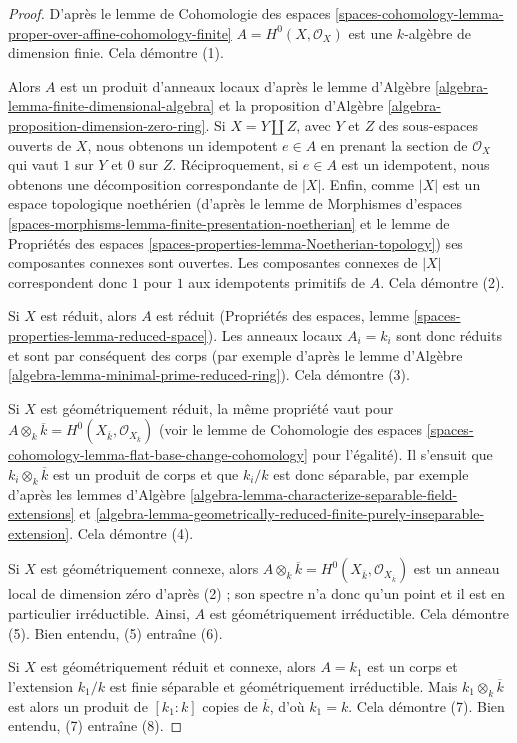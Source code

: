 \begin{proof}
D'après le lemme de Cohomologie des espaces
\ref{spaces-cohomology-lemma-proper-over-affine-cohomology-finite}
$A = H^0(X, \mathcal{O}_X)$ est une
$k$-algèbre de dimension finie. Cela démontre (1).

\medskip\noindent
Alors $A$ est un produit d'anneaux locaux d'après le
lemme d'Algèbre \ref{algebra-lemma-finite-dimensional-algebra} et la
proposition d'Algèbre \ref{algebra-proposition-dimension-zero-ring}.
Si $X = Y \amalg Z$, avec $Y$ et $Z$ des sous-espaces ouverts de $X$, nous obtenons
un idempotent $e \in A$ en prenant la section de $\mathcal{O}_X$
qui vaut $1$ sur $Y$ et $0$ sur $Z$. Réciproquement, si $e \in A$
est un idempotent, nous obtenons une décomposition correspondante de $|X|$.
Enfin, comme $|X|$ est un espace topologique noethérien
(d'après le lemme de Morphismes d'espaces
\ref{spaces-morphisms-lemma-finite-presentation-noetherian} et
le lemme de Propriétés des espaces
\ref{spaces-properties-lemma-Noetherian-topology})
ses composantes connexes sont ouvertes. Les composantes connexes
de $|X|$ correspondent donc $1$ pour $1$ aux idempotents primitifs de $A$.
Cela démontre (2).

\medskip\noindent
Si $X$ est réduit, alors $A$ est réduit
(Propriétés des espaces, lemme \ref{spaces-properties-lemma-reduced-space}).
Les anneaux locaux $A_i = k_i$ sont donc réduits et sont par conséquent des corps
(par exemple d'après le lemme d'Algèbre \ref{algebra-lemma-minimal-prime-reduced-ring}).
Cela démontre (3).

\medskip\noindent
Si $X$ est géométriquement réduit, la même propriété vaut pour
$A \otimes_k \overline{k} =
H^0(X_{\overline{k}}, \mathcal{O}_{X_{\overline{k}}})$
(voir le lemme de Cohomologie des espaces
\ref{spaces-cohomology-lemma-flat-base-change-cohomology} pour l'égalité).
Il s'ensuit que $k_i \otimes_k \overline{k}$ est un produit
de corps et que $k_i/k$ est donc séparable, par exemple d'après les
lemmes d'Algèbre
\ref{algebra-lemma-characterize-separable-field-extensions} et
\ref{algebra-lemma-geometrically-reduced-finite-purely-inseparable-extension}.
Cela démontre (4).

\medskip\noindent
Si $X$ est géométriquement connexe, alors $A \otimes_k \overline{k} =
H^0(X_{\overline{k}}, \mathcal{O}_{X_{\overline{k}}})$
est un anneau local de dimension zéro d'après (2) ; son
spectre n'a donc qu'un point et il est en particulier irréductible.
Ainsi, $A$ est géométriquement irréductible. Cela démontre (5).
Bien entendu, (5) entraîne (6).

\medskip\noindent
Si $X$ est géométriquement réduit et connexe, alors
$A = k_1$ est un corps et l'extension $k_1/k$ est finie séparable et
géométriquement irréductible. Mais $k_1 \otimes_k \overline{k}$
est alors un produit de $[k_1 : k]$ copies de $\overline{k}$, d'où
$k_1 = k$. Cela démontre (7). Bien entendu, (7) entraîne (8).
\end{proof}

